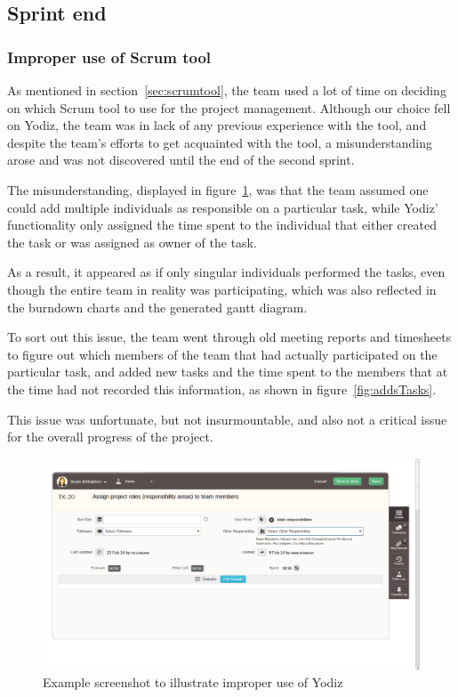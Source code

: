 \subsection{Sprint end}

\subsubsection{Improper use of Scrum tool}
\label{sec:improperScrum}
As mentioned in section~\ref{sec:scrumtool}, the team used a lot of time on
deciding on which Scrum tool to use for the project management. Although our
choice fell on Yodiz, the team was in lack of any previous experience with the
tool, and despite the team's efforts to get acquainted with the tool, a
misunderstanding arose and was not discovered until the end of the second
sprint.

The misunderstanding, displayed in figure~\ref{fig:wrongUse}, was that the team
assumed one could add multiple individuals as responsible on a particular task,
while Yodiz' functionality only assigned the time spent to the individual that
either created the task or was assigned as owner of the task.

As a result, it appeared as if only singular individuals performed the tasks,
even though the entire team in reality was participating, which was also
reflected in the burndown charts and the generated gantt diagram. 

To sort out this issue, the team went through old meeting reports and timesheets
to figure out which members of the team that had actually participated on the
particular task, and added new tasks and the time spent to the members that at
the time had not recorded this information, as shown in
figure~\ref{fig:addsTasks}.

This issue was unfortunate, but not insurmountable, and also not a critical
issue for the overall progress of the project.

\begin{figure}[H]
\includegraphics[width=\textwidth]{ch/sprints/fig/wrongUse.png}
\caption{Example screenshot to illustrate improper use of Yodiz}
\label{fig:wrongUse}
\end{figure}

